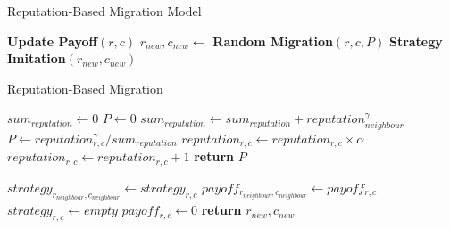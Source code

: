 \documentclass[11pt]{article}
\begin{document}
\begin{algorithm}[H]
  \caption{Reputation-Based Migration Model}\label{reputationbased}
	\begin{algorithmic}[1]
			
			\State \textbf{Update Payoff$(r,c)$}
			\State $r_{new},c_{new} \gets$ \textbf{Random Migration$(r,c,P)$}
			\State \textbf{Strategy Imitation$(r_{new},c_{new})$}
		\EndFor      
		\EndFor      
    \EndProcedure
	\end{algorithmic}
\end{algorithm}

\begin{algorithm}[H]
  \caption{Reputation-Based Migration}\label{reputationbasedmigration}
	\begin{algorithmic}[1]
      \State $sum_{reputation} \gets 0$
	  \State $P \gets 0$
        \State $sum_{reputation} \gets sum_{reputation} + reputation_{neighbour}^{\gamma}$
      \EndFor
      	\State $P \gets reputation_{r,c}^{\gamma} / sum_{reputation}$
      \EndIf
      \State $reputation_{r,c} \gets reputation_{r,c} \times \alpha$ 
      	\State $reputation_{r,c} \gets reputation_{r,c} + 1$
      \EndIf
      \State \textbf{return} $P$ 
    \EndProcedure
  \end{algorithmic}
		
	\begin{algorithmic}[1]
       
      \State $strategy_{r_{neighbour},c_{neighbour}} \gets strategy_{r,c}$   
      \State $payoff_{r_{neighbour},c_{neighbour}} \gets payoff_{r,c}$
      \State $strategy_{r,c} \gets empty$   
      \State $payoff_{r,c} \gets 0$
      \State \textbf{return} $r_{new},c_{new}$	
    \EndProcedure
  \end{algorithmic}
\end{algorithm}
\end{document}
